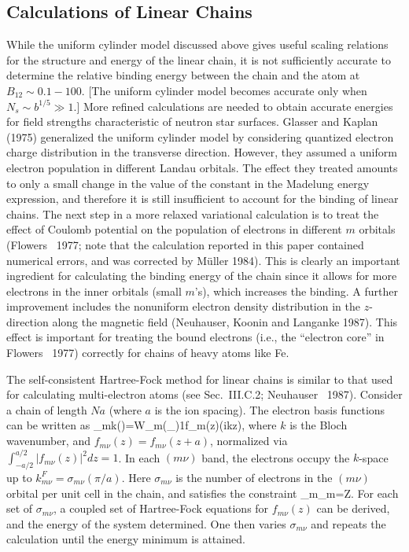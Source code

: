 \subsection{Calculations of Linear Chains}

While the uniform cylinder model discussed above gives useful scaling relations
for the structure and energy of the linear chain, it is not sufficiently
accurate to determine the relative binding energy between the chain and the 
atom at $B_{12}\sim 0.1-100$. [The uniform cylinder model becomes 
accurate only when $N_s\sim b^{1/5}\gg 1$.] More refined calculations 
are needed to obtain accurate energies for field strengths characteristic 
of neutron star surfaces. Glasser and Kaplan (1975) generalized the uniform
cylinder model by considering quantized electron charge distribution
in the transverse direction. However, they assumed a uniform 
electron population in different Landau orbitals. The effect they treated 
amounts to only a small change in the value of the constant in the Madelung
energy expression, and therefore it is still insufficient to 
account for the binding of linear chains. The next step in a more relaxed 
variational calculation is to treat the effect of Coulomb potential 
on the population of electrons in different $m$ orbitals 
(Flowers \etal~1977; note that the calculation reported in this paper 
contained numerical errors, and was corrected by M\"uller 1984).
This is clearly an important ingredient for calculating the binding energy
of the chain since it allows for more electrons in the inner orbitals 
(small $m$'s), which increases the binding. A further improvement 
includes the nonuniform electron density distribution in the $z$-direction 
along the magnetic field (Neuhauser, Koonin and Langanke 1987). This effect 
is important for treating the bound electrons (i.e., the 
``electron core'' in Flowers \etal~1977) correctly for chains of heavy 
atoms like Fe. 

The self-consistent Hartree-Fock method for linear chains is similar to
that used for calculating multi-electron atoms
(see Sec.~III.C.2; Neuhauser \etal~1987). Consider a chain of length $Na$
(where $a$ is the ion spacing). The electron basis functions can be 
written as
\be
\Phi_{m\nu k}(\br)=W_m(\br_\perp){1\over{}}f_{m\nu}(z)\exp({ikz}),
\label{basis}\ee
where $k$ is the Bloch wavenumber, and $f_{m\nu}(z)=f_{m\nu}(z+a)$,
normalized via $\int_{-a/2}^{a/2}|f_{m\nu}(z)|^2dz=1$. In each
$(m\nu)$ band, the electrons occupy the $k$-space up to
$k_{m\nu}^F=\sigma_{m\nu}(\pi/a)$. Here
$\sigma_{m\nu}$ is the number of electrons in the $(m\nu)$ orbital
per unit cell in the chain, and satisfies the constraint
\be
\sum_{m\nu}\sigma_{m\nu}=Z.
\label{constraint}\ee
For each set of $\sigma_{m\nu}$, a coupled set of Hartree-Fock equations 
for $f_{m\nu}(z)$ can be derived, and the energy of the system determined. One
then varies $\sigma_{m\nu}$ and repeats the calculation until the energy
minimum is attained.

